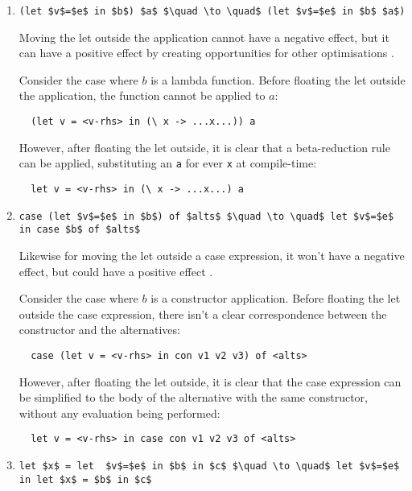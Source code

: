 \begin{enumerate}
\item \lstinline[style=math]{(let $v$=$e$ in $b$) $a$ $\quad \to \quad$ (let $v$=$e$ in $b$ $a$)}

Moving the let outside the application cannot have a negative effect, but it can have a positive effect by creating opportunities for other optimisations \citep{jones1996}.

Consider the case where $b$ is a lambda function. Before floating the let outside the application, the function cannot be applied to $a$:

\begin{lstlisting}
  (let v = <v-rhs> in (\ x -> ...x...)) a
\end{lstlisting}

However, after floating the let outside, it is clear that a beta-reduction rule can be applied, substituting an \lstinline{a} for ever \lstinline{x} at compile-time:

\begin{lstlisting}
  let v = <v-rhs> in (\ x -> ...x...) a
\end{lstlisting}

\item \lstinline[style=math]{case (let $v$=$e$ in $b$) of $alts$ $\quad \to \quad$ let $v$=$e$ in case $b$ of $alts$}

Likewise for moving the let outside a case expression, it won't have a negative effect, but could have a positive effect \citep{jones1996}.

Consider the case where $b$ is a constructor application. Before floating the let outside the case expression, there isn't a clear correspondence between the constructor and the alternatives:

\begin{lstlisting}
  case (let v = <v-rhs> in con v1 v2 v3) of <alts>
\end{lstlisting}

However, after floating the let outside, it is clear that the case expression can be simplified to the body of the alternative with the same constructor, without any evaluation being performed:

\begin{lstlisting}
  let v = <v-rhs> in case con v1 v2 v3 of <alts>
\end{lstlisting}

\item \lstinline[style=math]{let $x$ = let  $v$=$e$ in $b$ in $c$ $\quad \to \quad$ let $v$=$e$ in let $x$ = $b$ in $c$}


\end{enumerate}
